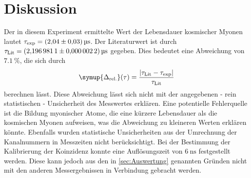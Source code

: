 \section{Diskussion}
\label{sec:Diskussion}
Der in diesem Experiment ermittelte Wert der Lebensdauer kosmischer Myonen lautet $\tau_\text{exp} = \qty{2.04 +- 0.03}{\micro\second}$. Der Literaturwert ist 
durch $\tau_\text{Lit} = \qty{2.1969811+-0.0000022}{\micro\second}$ \cite{PDG:muon} gegeben. Dies bedeutet eine Abweichung von $\qty{7.1}{\percent}$, die sich durch 
\begin{equation}
\symup{\Delta_\text{rel.}}(\tau) = \frac{|\tau_\text{Lit} - \tau_\text{exp}|}{\tau_\text{Lit}}
\end{equation}
berechnen lässt. Diese Abweichung lässt sich nicht mit der angegebenen - rein statistischen - Unsicherheit des Messwertes erklären. Eine potentielle Fehlerquelle
ist die Bildung myonischer Atome, die eine kürzere Lebensdauer als die kosmischen Myonen aufweisen, was die Abweichung zu kleineren Werten erklären könnte.
Ebenfalls wurden statistische Unsicherheiten aus der Umrechnung der Kanalnummern in Messzeiten nicht berücksichtigt. 
Bei der Bestimmung der Kalibrierung der 
Koinzidenz konnte eine Auflösungszeit von $\qty{6}{\nano\second}$ festgestellt werden. Diese kann jedoch aus den in \autoref{sec:Auswertung} genannten Gründen
nicht mit den anderen Messergebnissen in Verbindung gebracht werden.
